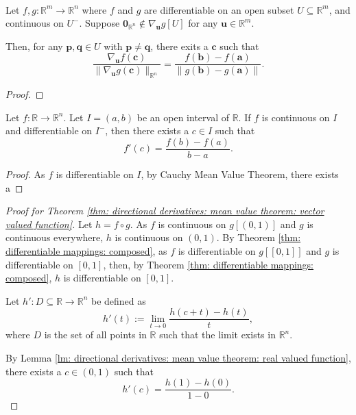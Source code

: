 \begin{lemma}
	 \
	
	Let $f, g: \mathbb R^m \to \mathbb R^n$ where $f$ and $g$ are differentiable on an open subset $U \subseteq \mathbb R^m$, and continuous on $U^-$. Suppose $\mathbf 0_{\mathbb R^n} \notin \nabla_{\mathbf u}g[U]$ for any $\mathbf u \in \mathbb R^m$.
	
	Then, for any $\mathbf p, \mathbf q \in U$ with $\mathbf p \ne \mathbf q$, there exits a $\mathbf c$ such that
	$$
	\frac{\nabla_{\mathbf u} f(\mathbf c)}{\| \nabla_{\mathbf u} g(\mathbf c) \|_{\mathbb R^n}} = \frac{f(\mathbf b) - f(\mathbf a)}{\| g(\mathbf b) - g(\mathbf a) \|}.
	$$
	
	\begin{proof}
		
	\end{proof}
\end{lemma}


\begin{lemma}
	\label{lm: directional derivatives: mean value theorem: real valued function}
	
	Let $f: \mathbb R \to \mathbb R^n$. Let $I = (a,b)$ be an open interval of $\mathbb R$. If $f$ is continuous on $I$ and differentiable on $I^-$, then there exists a $c \in I$ such that
	$$
	f'(c) = \frac{f(b) - f(a)}{b - a}.
	$$
	
	\begin{proof}
		As $f$ is differentiable on $I$, by Cauchy Mean Value Theorem, there exists a
	\end{proof}
\end{lemma}



\begin{proof}[Proof for Theorem \ref{thm: directional derivatives: mean value theorem: vector valued function}]
	Let $h = f \circ g$. As $f$ is continuous on $g[(0,1)]$ and $g$ is continuous everywhere, $h$ is continuous on $(0,1)$. By Theorem \ref{thm: differentiable mappings: composed}, as $f$ is differentiable on $g[[0,1]]$ and $g$ is differentiable on $[0,1]$, then, by Theorem \ref{thm: differentiable mappings: composed}, $h$ is differentiable on $[0,1]$.
	
	Let $h': D \subseteq \mathbb R \to \mathbb R^n$ be defined as
	$$
	h'(t) := \lim_{t \to 0} \frac{h(c + t) - h(t)}{t},
	$$
	where $D$ is the set of all points in $\mathbb R$ such that the limit exists in $\mathbb R^n$.
	
	By Lemma \ref{lm: directional derivatives: mean value theorem: real valued function}, there exists a $c \in (0,1)$ such that
	$$
	h'(c) = \frac{h(1) - h(0)}{1 - 0}.
	$$
	
	
\end{proof}



